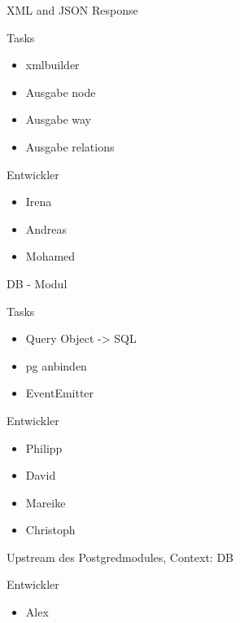 \documentclass{beamer}
\begin{document}
\begin{frame}{XML and JSON Response}
    \begin{block}{Tasks}
        \begin{itemize}
        \item xmlbuilder
        \item Ausgabe node
        \item Ausgabe way
        \item Ausgabe relations
        \end{itemize}
    \end{block}
    \begin{block}{Entwickler}
        \begin{itemize}
        \item Irena
        \item Andreas
        \item Mohamed
        \end{itemize}
    \end{block}

\end{frame}

\begin{frame}{DB - Modul}
    \begin{block}{Tasks}
        \begin{itemize}
        \item Query Object -> SQL
        \item pg anbinden
        \item EventEmitter
        \end{itemize}
    \end{block}
    \begin{block}{Entwickler}
        \begin{itemize}
        \item Philipp
        \item David
        \item Mareike
        \item Christoph
        \end{itemize}
    \end{block}
\end{frame}

\begin{frame}{Upstream des Postgredmodules, Context: DB}
    \begin{block}{Entwickler}
        \begin{itemize}
        \item Alex
        \end{itemize}
    \end{block}

\end{frame}
\end{document}
